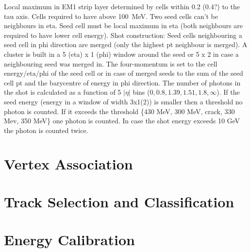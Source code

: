 Local maximum in EM1 strip layer determined by cells within 0.2 (0.4?) to the
tau axis. Cells required to have above \SI{100}{\mega\electronvolt}. Two seed
cells can't be neighbours in eta. Seed cell must be local maximum in eta (both
neighbours are required to have lower cell energy). Shot construction: Seed
cells neighbouring a seed cell in phi direction are merged (only the highest pt
neighbour is merged). A cluster is built in a 5 (eta) x 1 (phi) window around
the seed or 5 x 2 in case a neighbouring seed was merged in. The four-momentum
is set to the cell energy/eta/phi of the seed cell or in case of merged seeds to
the sum of the seed cell pt and the barycentre of energy in phi direction. The
number of photons in the shot is calculated as a function of 5 $|\eta|$ bins
($0, 0.8, 1.39, 1.51, 1.8, \infty$). If the seed energy (energy in a window of
width 3x1(2)) is smaller then a threshold no photon is counted. If it exceeds
the threshold \{430 MeV, 300 MeV, crack, 330 Mev, 350 MeV\} one photon is
counted. In case the shot energy exceeds 10 GeV the photon is counted twice.



\section{Vertex Association}
\label{sec:reco_vertex_assoc}

\section{Track Selection and Classification}
\label{sec:reco_track_sel_classif}

\section{Energy Calibration}
\label{sec:reco_energy_calib}


